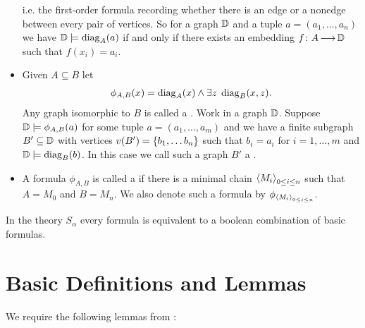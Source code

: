 \begin{Definition}
\begin{itemize}
    i.e. the first-order formula recording whether there is an edge or a nonedge between every pair of vertices.
    So for a graph $\mathbb D$ and a tuple $a = (a_1, \ldots, a_n)$ we have $\mathbb D \models \operatorname{diag}_A(a)$ if and only if
    there exists an embedding $f \colon A \operatorname{\longrightarrow} \mathbb D$ such that $f(x_i) = a_i$.
  \item Given $A \subseteq B$ let 
    \begin{align*}
      \phi_{A,B}(x) = \operatorname{diag}_A(x) \wedge \exists z \; \operatorname{diag}_B(x, z).
    \end{align*}
    Any graph isomorphic to $B$ is called a .
    Work in a graph $\mathbb D$.
    Suppose $\mathbb D \models \phi_{A,B}(a)$ for some tuple $a = (a_1, \ldots, a_m)$
    and we have a finite subgraph $B' \subseteq \mathbb D$ with vertices $v(B') = \left\{b_1, \ldots b_n\right\}$
    such that $b_i = a_i$ for $i = 1, \ldots, m$ and $\mathbb D \models \operatorname{diag}_B(b)$.
    In this case we call such a graph $B'$ a .
  \item A formula $\phi_{A,B}$ is called a 
    if there is a minimal chain $\left\langle M_i \right\rangle_{0 \leq i \leq n}$
    such that $A = M_0$ and $B = M_n$.
    We also denote such a formula by $\phi_{\left\langle M_i \right\rangle_{0 \leq i \leq n}}$. 
  \end{itemize}
\end{Definition}
 
\begin{Theorem} 
  In the theory $S_\alpha$ every formula is equivalent to a boolean combination of basic formulas.
\end{Theorem}

\section{Basic Definitions and Lemmas}
We require the following lemmas from \cite{laskowski}:

